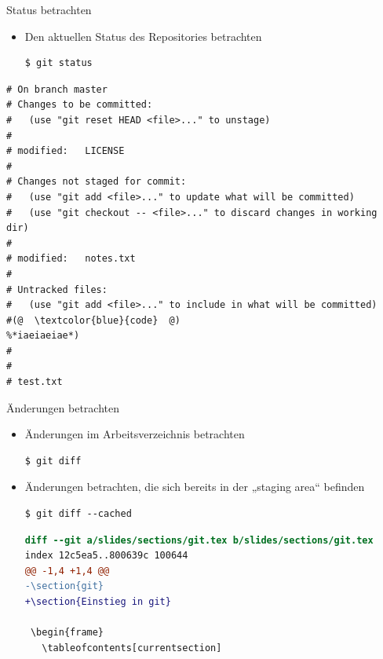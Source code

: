 \begin{frame}[fragile]{Status betrachten}
  \begin{itemize}
    \item Den aktuellen Status des Repositories betrachten
    \begin{lstlisting}
$ git status
    \end{lstlisting}
  \end{itemize}
  \begin{lstlisting}[language=gitstatus,frame=single]
# On branch master
# Changes to be committed:
#   (use "git reset HEAD <file>..." to unstage)
#
# modified:   LICENSE
#
# Changes not staged for commit:
#   (use "git add <file>..." to update what will be committed)
#   (use "git checkout -- <file>..." to discard changes in working dir)
#
# modified:   notes.txt
#
# Untracked files:
#   (use "git add <file>..." to include in what will be committed)
#(@  \textcolor{blue}{code}  @)
%*iaeiaeiae*)
#
#
# test.txt
  \end{lstlisting}
\end{frame}

\begin{frame}[fragile]{Änderungen betrachten}
  \begin{itemize}
    \item Änderungen im Arbeitsverzeichnis betrachten
    \begin{lstlisting}
$ git diff
    \end{lstlisting}
    \item Änderungen betrachten, die sich bereits in der „staging area“ befinden
    \begin{lstlisting}
$ git diff --cached
    \end{lstlisting}
    \begin{lstlisting}[frame=single, caption=Ausgabe von git diff,language=diff]
diff --git a/slides/sections/git.tex b/slides/sections/git.tex
index 12c5ea5..800639c 100644
@@ -1,4 +1,4 @@
-\section{git}
+\section{Einstieg in git}
 
 \begin{frame}
   \tableofcontents[currentsection]
    \end{lstlisting}
  \end{itemize}
\end{frame}

